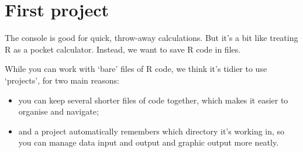 \documentclass[
]{book}
\providecommand{\tightlist}{%
  \setlength{\itemsep}{0pt}\setlength{\parskip}{0pt}}
\begin{document}
\hypertarget{first-project}{%
\section{First project}\label{first-project}}

The console is good for quick, throw-away calculations. But it's a bit like treating R as a pocket calculator. Instead, we want to save R code in files.

While you can work with `bare' files of R code, we think it's tidier to use `projects', for two main reasons:

\begin{itemize}
\tightlist
\item
  you can keep several shorter files of code together, which makes it easier to organise and navigate;
\item
  and a project automatically remembers which directory it's working in, so you can manage data input and output and graphic output more neatly.
\end{itemize}
\end{document}
